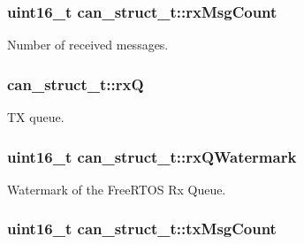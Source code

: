 \subsubsection[{\texorpdfstring{rx\+Msg\+Count}{rxMsgCount}}]{\setlength{\rightskip}{0pt plus 5cm}uint16\+\_\+t can\+\_\+struct\+\_\+t\+::rx\+Msg\+Count}\hypertarget{structcan__struct__t_afaa8f7119b799b00f2ce4f014ec98629}{}\label{structcan__struct__t_afaa8f7119b799b00f2ce4f014ec98629}


Number of received messages. 

\subsubsection[{\texorpdfstring{rxQ}{rxQ}}]{ can\+\_\+struct\+\_\+t\+::rxQ}\hypertarget{structcan__struct__t_a1a1c2bdb829e45a31cafa44620d4bdd0}{}\label{structcan__struct__t_a1a1c2bdb829e45a31cafa44620d4bdd0}


TX queue. 

\subsubsection[{\texorpdfstring{rx\+Q\+Watermark}{rxQWatermark}}]{\setlength{\rightskip}{0pt plus 5cm}uint16\+\_\+t can\+\_\+struct\+\_\+t\+::rx\+Q\+Watermark}\hypertarget{structcan__struct__t_ac4f9dd16c31c2a75d97e1310d414345d}{}\label{structcan__struct__t_ac4f9dd16c31c2a75d97e1310d414345d}


Watermark of the Free\+R\+T\+OS Rx Queue. 

\subsubsection[{\texorpdfstring{tx\+Msg\+Count}{txMsgCount}}]{\setlength{\rightskip}{0pt plus 5cm}uint16\+\_\+t can\+\_\+struct\+\_\+t\+::tx\+Msg\+Count}\hypertarget{structcan__struct__t_ad13c7c5a692c2808a1f13250a726fcc3}{}\label{structcan__struct__t_ad13c7c5a692c2808a1f13250a726fcc3}


